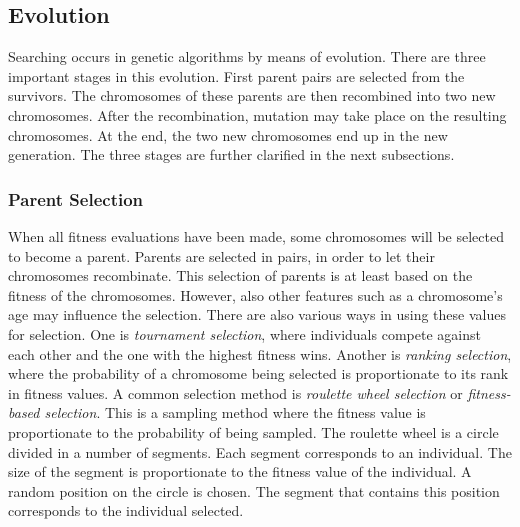 \subsection{Evolution}
\label{sec:approach_intro_evolution}
Searching occurs in genetic algorithms by means of evolution. There are three
important stages in this evolution. First parent pairs are selected from the
survivors. The chromosomes of these parents are then recombined into two new
chromosomes. After the recombination, mutation may take place on the resulting
chromosomes. At the end, the two new chromosomes end up in the new generation.
The three stages are further clarified in the next subsections.
\subsubsection{Parent Selection}
When all fitness evaluations have been made, some chromosomes will be selected
to become a parent. Parents are selected in pairs, in order to let their
chromosomes recombinate. This selection of parents is at least based on the
fitness of the chromosomes. However, also other features such as a chromosome's
age may influence the selection. There are also various ways in using these
values for selection. One is \emph{tournament selection}, where individuals
compete against each other and the one with the highest fitness wins. Another
is \emph{ranking selection}, where the probability of a chromosome being
selected is proportionate to its rank in fitness values. A common selection
method is \emph{roulette wheel selection} or \emph{fitness-based selection}.
This is a sampling method where the fitness value is proportionate to the
probability of being sampled. The roulette wheel is a circle divided in a
number of segments. Each segment corresponds to an individual. The size of the
segment is proportionate to the fitness value of the individual. A random
position on the circle is chosen. The segment that contains this position
corresponds to the individual selected.
